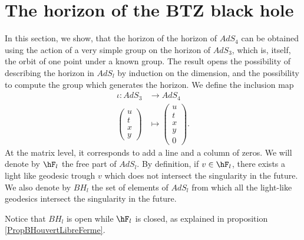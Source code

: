\section{The horizon of the BTZ black hole}
\label{SecNewWithMatrices}

In this section, we show, that the horizon of the horizon of $AdS_4$ can be obtained using the action of a very simple group on the horizon of $AdS_3$, which is, itself, the orbit of one point under a known group. The result opens the possibility of describing the horizon in $AdS_l$ by induction on the dimension, and the possibility to compute the group which generates the horizon.  We define the inclusion map 
\begin{equation}
	\begin{aligned}
		\iota\colon AdS_3&\to AdS_4 \\
		\begin{pmatrix}
			u	\\ 
			t	\\ 
			x	\\ 
			y	
		\end{pmatrix}&\mapsto \begin{pmatrix}
			u	\\ 
			t	\\ 
			x	\\ 
			y	\\ 
			0	
		\end{pmatrix}.
	\end{aligned}
\end{equation}
At the matrix level, it corresponds to add a line and a column of zeros. We will denote by $\hF_l$ the free part of $AdS_l$. By definition, if $v\in\hF_l$, there exists a light like geodesic trough $v$ which does not intersect the singularity in the future. We also denote by $BH_l$ the set of elements of $AdS_l$ from which all the light-like geodesics intersect the singularity in the future.

Notice that $BH_l$ is open while $\hF_l$ is closed, as explained in proposition \ref{PropBHouvertLibreFerme}.

